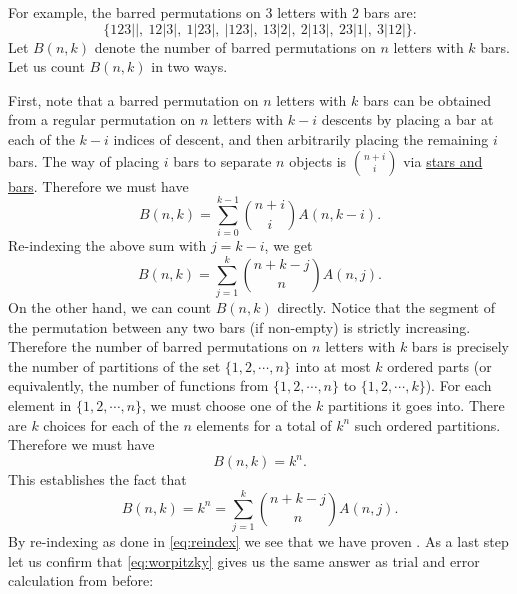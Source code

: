\documentclass[a4paper, english, 12pt]{article} %
\begin{document}
\begin{answer}
  For example, the barred permutations on $3$ letters with $2$ bars are:
  \begin{equation*}
    \{123||,\ 12|3|,\ 1|23|,\ |123|,\ 13|2|,\ 2|13|,\ 23|1|,\ 3|12|\}.
  \end{equation*}
  Let $B(n,k)$ denote the number of barred permutations on $n$ letters with $k$
  bars. Let us count $B(n,k)$ in two ways.

  First, note that a barred permutation on $n$ letters with $k$ bars can be
  obtained from a regular permutation on $n$ letters with $k-i$ descents by
  placing a bar at each of the $k-i$ indices of descent, and then arbitrarily
  placing the remaining $i$ bars. The way of placing $i$ bars to separate $n$
  objects is $\binom{n+i}{i}$ via \href{http://en.wikipedia.org/wiki/Stars_and_bars_\%28combinatorics\%29}{stars and bars}.
  Therefore we must have
  \begin{equation}
    \label{eq:reindex}
    B(n,k) = \sum_{i=0}^{k-1}\binom{n+i}{i}A(n,k-i).
  \end{equation}
  Re-indexing the above sum with $j=k-i$, we get
  \begin{equation*}
    B(n,k) = \sum_{j=1}^k\binom{n+k-j}{n}A(n,j).
  \end{equation*}
%
  On the other hand, we can count $B(n,k)$ directly. Notice that the segment of
  the permutation between any two bars (if non-empty) is strictly increasing.
  Therefore the number of barred permutations on $n$ letters with $k$ bars is
  precisely the number of partitions of the set $\{1,2,\cdots,n\}$ into at most
  $k$ ordered parts (or equivalently, the number of functions from
  $\{1,2,\cdots,n\}$ to $\{1,2,\cdots,k\}$). For each element in
  $\{1,2,\cdots,n\}$, we must choose one of the $k$ partitions it goes into.
  There are $k$ choices for each of the $n$ elements for a total of $k^n$ such
  ordered partitions. Therefore we must have
  \begin{equation*}
    B(n,k) = k^n.
  \end{equation*}
  This establishes the fact that
  \begin{equation*}
    B(n,k) = k^n = \sum_{j=1}^k\binom{n+k-j}{n}A(n,j).
  \end{equation*}
  By re-indexing as done in \cref{eq:reindex} we see that we have proven
  . As a last step let us confirm that
  \cref{eq:worpitzky} gives us the same answer as trial and error calculation
  from before:
  \begin{align*}

\end{align*}
\end{answer}
\end{document}
